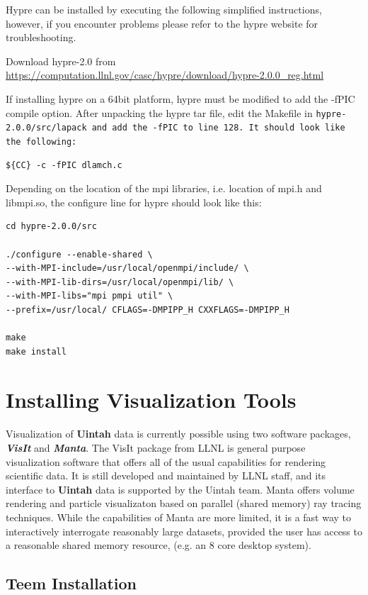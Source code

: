 \documentclass[12pt]{article}
\begin{document}
Hypre can be installed by executing the following simplified
instructions, however, if you encounter problems please refer to the
hypre website for troubleshooting.

Download hypre-2.0 from
\url{https://computation.llnl.gov/casc/hypre/download/hypre-2.0.0\_reg.html}

If installing hypre on a 64bit platform, hypre must be modified to add
the -fPIC compile option.  After unpacking the hypre tar file, edit
the Makefile in \tt hypre-2.0.0/src/lapack \normalfont and add the
-fPIC to line 128.  It should look like the following:

\begin{verbatim}
${CC} -c -fPIC dlamch.c
\end{verbatim}

Depending on the location of the mpi libraries, i.e. location of mpi.h
and libmpi.so, the configure line for hypre should look like this:
\begin{verbatim}
cd hypre-2.0.0/src

./configure --enable-shared \
--with-MPI-include=/usr/local/openmpi/include/ \
--with-MPI-lib-dirs=/usr/local/openmpi/lib/ \
--with-MPI-libs="mpi pmpi util" \
--prefix=/usr/local/ CFLAGS=-DMPIPP_H CXXFLAGS=-DMPIPP_H

make
make install
\end{verbatim}

 

\section{Installing Visualization Tools}

Visualization of \textbf{Uintah} data is currently possible using two
software packages, \textbf{\emph{VisIt}} and \textbf{\emph{Manta}}. The
VisIt package from LLNL is general purpose visualization software that
offers all of the usual capabilities for rendering scientific data.
It is still developed and maintained by LLNL staff, and its interface
to \textbf{Uintah} data is supported by the Uintah team.  Manta offers
volume rendering and particle visualizaton based on parallel (shared
memory) ray tracing techniques.  While the capabilities of Manta are
more limited, it is a fast way to interactively interrogate reasonably
large datasets, provided the user has access to a reasonable shared
memory resource, (e.g. an 8 core desktop system).

\subsection{Teem Installation}
\label{subsec:teem}
\end{document}
